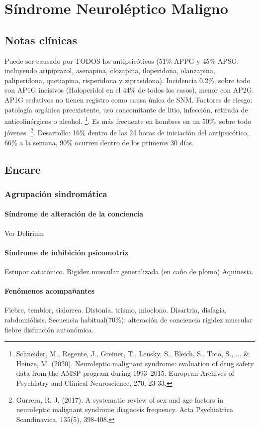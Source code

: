 \chapter{Síndrome Neuroléptico Maligno}
\section*{Notas clínicas}
Puede ser causado por TODOS los antipsicóticos (51\% APPG y 45\% APSG: incluyendo aripiprazol, asenapina, clozapina, iloperidona, olanzapina, paliperidona, quetiapina, risperidona y ziprasidona). Incidencia 0.2\%, sobre todo con AP1G incisivos (Haloperidol en el 44\% de todos los casos), menor con AP2G. AP1G sedativos no tienen registro como causa única de SNM. 
Factores de riesgo: patología orgánica preexistente, uso concomitante de litio, infección, retirada de anticolinérgicos o alcohol. \footnote{Schneider, M., Regente, J., Greiner, T., Lensky, S., Bleich, S., Toto, S., ... \& Heinze, M. (2020). Neuroleptic malignant syndrome: evaluation of drug safety data from the AMSP program during 1993–2015. European Archives of Psychiatry and Clinical Neuroscience, 270, 23-33.}. Es más frecuente en hombres en un 50\%, sobre todo jóvenes. \footnote{Gurrera, R. J. (2017). A systematic review of sex and age factors in neuroleptic malignant syndrome diagnosis frequency. Acta Psychiatrica Scandinavica, 135(5), 398-408.}. 
Desarrollo: 16\% dentro de las 24 horas de iniciación del antipsicótico, 66\% a la semana, 90\% ocurren dentro de los primeros 30 días.
\section*{Encare}
\subsection*{Agrupación sindromática}
\subsubsection*{Síndrome de alteración de la conciencia}
Ver Delirium
\subsubsection*{Síndrome de inhibición psicomotriz}
Estupor catatónico.
Rigidez muscular generalizada (en caño de plomo)
Aquinesia.
\subsubsection*{Fenómenos acompañantes}
Fiebre, temblor, sialorrea. Distonía, trismo, mioclono. Disartria, disfagia, rabdomiólisis.
Secuencia habitual(70\%): alteración de conciencia \faArrowRight rigidez muscular \faArrowRight fiebre \faArrowRight disfunción autonómica.

